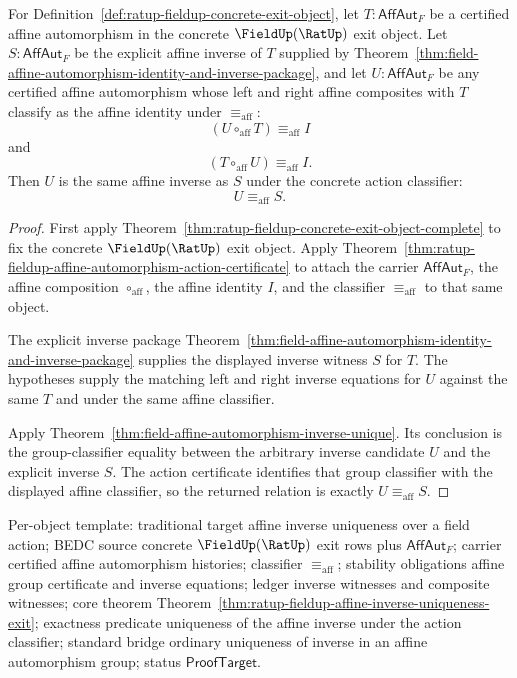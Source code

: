 \begin{theorem}
\label{thm:ratup-fieldup-affine-inverse-uniqueness-exit}
For Definition~\ref{def:ratup-fieldup-concrete-exit-object}, let
$T:\mathsf{AffAut}_F$ be a certified affine automorphism in the concrete
$\FieldUp(\RatUp)$ exit object. Let $S:\mathsf{AffAut}_F$ be the explicit affine
inverse of $T$ supplied by
Theorem~\ref{thm:field-affine-automorphism-identity-and-inverse-package}, and
let $U:\mathsf{AffAut}_F$ be any certified affine automorphism whose left and
right affine composites with $T$ classify as the affine identity under
$\equiv_{\mathrm{aff}}$:
$$
(U\circ_{\mathrm{aff}}T)\equiv_{\mathrm{aff}} I
$$
and
$$
(T\circ_{\mathrm{aff}}U)\equiv_{\mathrm{aff}} I.
$$
Then $U$ is the same affine inverse as $S$ under the concrete action classifier:
$$
U\equiv_{\mathrm{aff}}S.
$$
\end{theorem}
\begin{proof}
First apply Theorem~\ref{thm:ratup-fieldup-concrete-exit-object-complete} to
fix the concrete $\FieldUp(\RatUp)$ exit object. Apply
Theorem~\ref{thm:ratup-fieldup-affine-automorphism-action-certificate} to attach
the carrier $\mathsf{AffAut}_F$, the affine composition
$\circ_{\mathrm{aff}}$, the affine identity $I$, and the classifier
$\equiv_{\mathrm{aff}}$ to that same object.

The explicit inverse package
Theorem~\ref{thm:field-affine-automorphism-identity-and-inverse-package} supplies
the displayed inverse witness $S$ for $T$. The hypotheses supply the matching
left and right inverse equations for $U$ against the same $T$ and under the same
affine classifier.

Apply Theorem~\ref{thm:field-affine-automorphism-inverse-unique}. Its conclusion
is the group-classifier equality between the arbitrary inverse candidate $U$ and
the explicit inverse $S$. The action certificate identifies that group
classifier with the displayed affine classifier, so the returned relation is
exactly $U\equiv_{\mathrm{aff}}S$.
\end{proof}

Per-object template: traditional target affine inverse uniqueness over a field
action; BEDC source concrete $\FieldUp(\RatUp)$ exit rows plus
$\mathsf{AffAut}_F$; carrier certified affine automorphism histories; classifier
$\equiv_{\mathrm{aff}}$; stability obligations affine group certificate and
inverse equations; ledger inverse witnesses and composite witnesses; core
theorem
Theorem~\ref{thm:ratup-fieldup-affine-inverse-uniqueness-exit}; exactness
predicate uniqueness of the affine inverse under the action classifier; standard
bridge ordinary uniqueness of inverse in an affine automorphism group; status
$\mathsf{ProofTarget}$.

